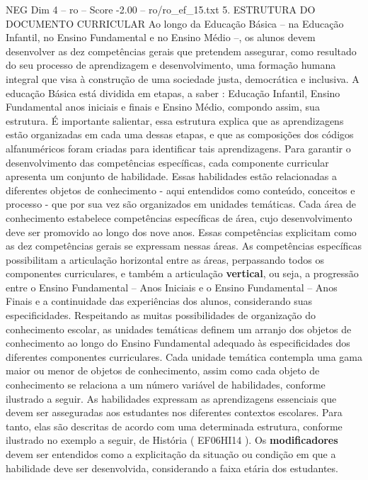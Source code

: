 \begin{textsample}{NEG Dim 4 – ro – Score -2.00 – ro/ro\_ef\_15.txt}  \label{ex:f4_neg_075}
5.
ESTRUTURA DO DOCUMENTO CURRICULAR Ao longo da Educação Básica – na Educação Infantil, no Ensino Fundamental e no Ensino Médio –, os alunos devem desenvolver as dez competências gerais que pretendem assegurar, como resultado do seu processo de aprendizagem e desenvolvimento, uma formação humana integral que visa à construção de uma sociedade justa, democrática e inclusiva.
A educação Básica está dividida em etapas, a saber : Educação Infantil, Ensino Fundamental anos iniciais e finais e Ensino Médio, compondo assim, sua estrutura.
É importante salientar, essa estrutura explica que as aprendizagens estão organizadas em cada uma dessas etapas, e que as composições dos códigos alfanuméricos foram criadas para identificar tais aprendizagens.
Para garantir o desenvolvimento das competências específicas, cada componente curricular apresenta um conjunto de habilidade.
Essas habilidades estão relacionadas a diferentes objetos de conhecimento - aqui entendidos como conteúdo, conceitos e processo - que por sua vez são organizados em unidades temáticas.
Cada área de conhecimento estabelece competências específicas de área, cujo desenvolvimento deve ser promovido ao longo dos nove anos.
Essas competências explicitam como as dez competências gerais se expressam nessas áreas.
As competências específicas possibilitam a articulação horizontal entre as áreas, perpassando todos os componentes curriculares, e também a articulação \textbf{vertical}, ou seja, a progressão entre o Ensino Fundamental – Anos Iniciais e o Ensino Fundamental – Anos Finais e a continuidade das experiências dos alunos, considerando suas especificidades.
Respeitando as muitas possibilidades de organização do conhecimento escolar, as unidades temáticas definem um arranjo dos objetos de conhecimento ao longo do Ensino Fundamental adequado às especificidades dos diferentes componentes curriculares.
Cada unidade temática contempla uma gama maior ou menor de objetos de conhecimento, assim como cada objeto de conhecimento se relaciona a um número variável de habilidades, conforme ilustrado a seguir.
As habilidades expressam as aprendizagens essenciais que devem ser asseguradas aos estudantes nos diferentes contextos escolares.
Para tanto, elas são descritas de acordo com uma determinada estrutura, conforme ilustrado no exemplo a seguir, de História ( EF06HI14 ).
Os \textbf{modificadores} devem ser entendidos como a explicitação da situação ou condição em que a habilidade deve ser desenvolvida, considerando a faixa etária dos estudantes.

\end{textsample}
